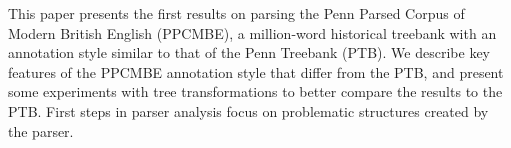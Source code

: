 This paper presents the first results on parsing the  Penn Parsed Corpus of Modern British English (PPCMBE), a million-word   historical treebank with an annotation style similar to that  of the Penn Treebank (PTB).  We describe key features of the PPCMBE annotation style that differ from the PTB, and present some experiments with tree transformations to better compare the results to the PTB. First steps in parser analysis focus on problematic structures created by the parser.
